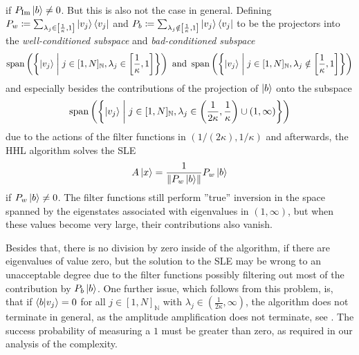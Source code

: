 \begin{enumerate}[label=\arabic*.]
\begin{align}
    \end{align}
    if \(P_{\Im}\ket{b} \neq 0\). But this is also not the case in general. Defining \(P_w \coloneqq \sum_{\lambda_j \in \left[\frac{1}{\kappa}, 1\right]} \ket{v_j}\bra{v_j}\) and \(P_b \coloneqq \sum_{\lambda_j \notin \left[\frac{1}{\kappa}, 1\right]} \ket{v_j}\bra{v_j}\) to be the projectors into the \emph{well-conditioned subspace} and \emph{bad-conditioned subspace}
    \begin{align}
        \operatorname{span}\left(\left\{\ket{v_j} \; \middle| \; j \in [1, N]_{\mathbb{N}}, \lambda_j \in \left[\frac{1}{\kappa}, 1\right]\right\}\right) \text{ and } \operatorname{span}\left(\left\{\ket{v_j} \; \middle| \; j \in [1, N]_{\mathbb{N}}, \lambda_j \notin \left[\frac{1}{\kappa}, 1\right]\right\}\right)
    \end{align}
    and especially besides the contributions of the projection of \(\ket{b}\) onto the subspace
    \begin{align}
        \operatorname{span}\left(\left\{\ket{v_j} \; \middle| \; j \in [1, N]_{\mathbb{N}}, \lambda_j \in \left(\frac{1}{2\kappa}, \frac{1}{\kappa}\right) \cup \left(1, \infty\right)\right\}\right)
    \end{align}
    due to the actions of the filter functions in \((1/(2\kappa), 1/\kappa)\) and afterwards, the HHL algorithm solves the SLE
    \begin{align}
        A\ket{x} = \frac{1}{\norm{P_{w}\ket{b}}} P_{w}\ket{b}
    \end{align}
    if \(P_{w}\ket{b} \neq 0\). The filter functions still perform ''true'' inversion in the space spanned by the eigenstates associated with eigenvalues in \((1, \infty)\), but when these values become very large, their contributions also vanish.

    \phantom{}
    
    Besides that, there is no division by zero inside of the algorithm, if there are eigenvalues of value zero, but the solution to the SLE may be wrong to an unacceptable degree due to the filter functions possibly filtering out most of the contribution by \(P_b\ket{b}\). One further issue, which follows from this problem, is, that if \(\braket{b}{v_j} = 0\) for all \(j \in [1, N]_{\mathbb{N}}\) with \(\lambda_j \in \left(\frac{1}{2\kappa}, \infty\right)\), the algorithm does not terminate in general, as the amplitude amplification does not terminate, see . The success probability of measuring a \(1\) must be greater than zero, as required in our analysis of the complexity.
    

\end{enumerate}
